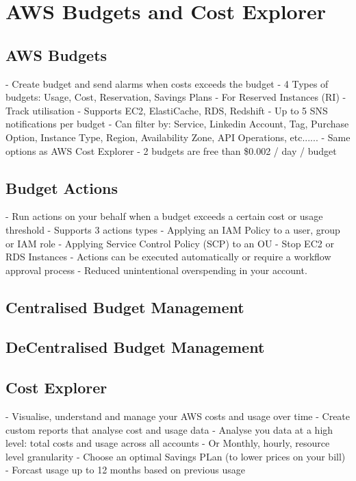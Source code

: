 \documentclass[11pt]{book}
\begin{document}
    \section{AWS Budgets and Cost Explorer}

    \subsection{AWS Budgets}
    - Create budget and send alarms when costs exceeds the budget
    - 4 Types of budgets: Usage, Cost, Reservation, Savings Plans
    - For Reserved Instances (RI)
    - Track utilisation
    - Supports EC2, ElastiCache, RDS, Redshift
    - Up to 5 SNS notifications per budget
    - Can filter by: Service, Linkedin Account, Tag, Purchase Option, Instance Type, Region, Availability Zone, API Operations, etc......
    - Same options as AWS Cost Explorer
    - 2 budgets are free than \$0.002 / day / budget

    \subsection{Budget Actions}
    - Run actions on your behalf when a budget exceeds a certain cost or usage threshold
    - Supports 3 actions types
    - Applying an IAM Policy to a user, group or IAM role
    - Applying Service Control Policy (SCP) to an OU
    - Stop EC2 or RDS Instances
    - Actions can be executed automatically or require a workflow approval process
    - Reduced unintentional overspending in your account.

    \subsection{Centralised Budget Management}

    \subsection{DeCentralised Budget Management}

    \subsection{Cost Explorer}
    - Visualise, understand and manage your AWS costs and usage over time
    - Create custom reports that analyse cost and usage data
    - Analyse you data at a high level: total costs and usage across all accounts
    - Or Monthly, hourly, resource level granularity
    - Choose an optimal Savings PLan (to lower prices on your bill)
    - Forcast usage up to 12 months based on previous usage
\end{document}
